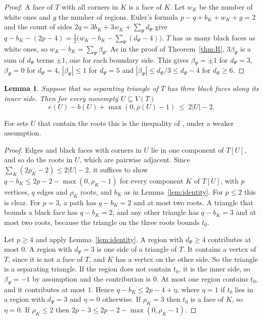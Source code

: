 \documentclass[10pt]{amsart}
\numberwithin{equation}{section}
\newtheorem{lemma}[equation]{Lemma}
\theoremstyle{definition}
\theoremstyle{remark}
\begin{document}
\begin{proof}
A face of $T$ with all corners in $K$ is a face of $K$.
Let $w_K$ be the number of white ones and $g$ the number of regions.
Euler's formula $p-q+b_K+w_K+g=2$ and the count of sides $2q=3b_K+3w_K+\sum_\Psi d_\Psi$ give $q-b_K-(2p-4)=\frac12\bigl(w_K-b_K-\sum_\Psi(d_\Psi-4)\bigr)$.
$T$ has as many black faces as white ones, so $w_K-b_K=\sum_\Psi\beta_\Psi$.
As in the proof of Theorem~\ref{thm:R}, $3\beta_\Psi$ is a sum of $d_\Psi$ terms $\pm1$, one for each boundary side.
This gives $\beta_\Psi=\pm1$ for $d_\Psi=3$, $\beta_\Psi=0$ for $d_\Psi=4$, $|\beta_\Psi|\le1$ for $d_\Psi=5$ and $|\beta_\Psi|\le d_\Psi/3\le d_\Psi-4$ for $d_\Psi\ge6$.
\end{proof}

\begin{lemma}\label{lem:density}
Suppose that no separating triangle of $T$ has three black faces along its inner side.
Then for every nonempty $U\subseteq V(T)$
\begin{equation}\label{eq:density}
e(U)-b(U)+\max(0,\rho(U)-1)\ \le\ 2|U|-2 .
\end{equation}
\end{lemma}

For sets $U$ that contain the roots this is the inequality of \cite[Lemma~4.4]{Paper}, under a weaker assumption.

\begin{proof}
Edges and black faces with corners in $U$ lie in one component of $T[U]$, and so do the roots in $U$, which are pairwise adjacent.
Since $\sum_K(2p_K-2)\le2|U|-2$, it suffices to show $q-b_K\le2p-2-\max(0,\rho_K-1)$ for every component $K$ of $T[U]$, with $p$ vertices, $q$ edges and $\rho_K$ roots, and $b_K$ as in Lemma~\ref{lem:identity}.
For $p\le2$ this is clear.
For $p=3$, a path has $q-b_K=2$ and at most two roots.
A triangle that bounds a black face has $q-b_K=2$, and any other triangle has $q-b_K=3$ and at most two roots, because the triangle on the three roots bounds $t_0$.

Let $p\ge4$ and apply Lemma~\ref{lem:identity}.
A region with $d_\Psi\ge4$ contributes at most $0$.
A region with $d_\Psi=3$ is one side of a triangle of $T$.
It contains a vertex of $T$, since it is not a face of $T$, and $K$ has a vertex on the other side.
So the triangle is a separating triangle.
If the region does not contain $t_0$, it is the inner side, so $\beta_\Psi=-1$ by assumption and the contribution is $0$.
At most one region contains $t_0$, and it contributes at most $1$.
Hence $q-b_K\le2p-4+\eta$, where $\eta=1$ if $t_0$ lies in a region with $d_\Psi=3$ and $\eta=0$ otherwise.
If $\rho_K=3$ then $t_0$ is a face of $K$, so $\eta=0$.
If $\rho_K\le2$ then $2p-3\le2p-2-\max(0,\rho_K-1)$.
\end{proof}
\end{document}
